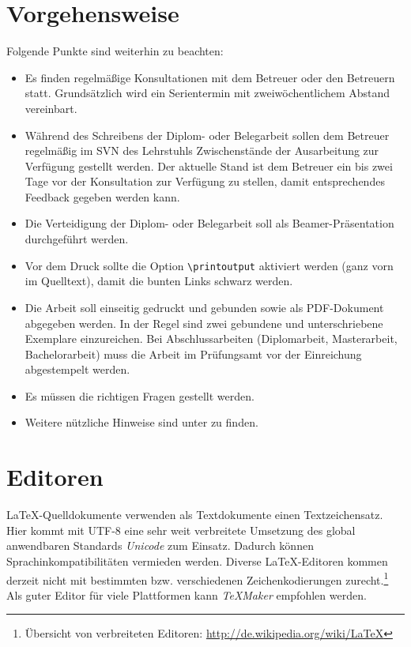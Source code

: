 \section{Vorgehensweise}
Folgende Punkte sind weiterhin zu beachten:
\begin{itemize}
	\item Es finden regelmäßige Konsultationen mit dem Betreuer oder den Betreuern statt. Grundsätzlich wird ein Serientermin mit zweiwöchentlichem Abstand vereinbart.
	\item Während des Schreibens der Diplom- oder Belegarbeit sollen dem Betreuer regelmäßig im \gls{SVN} des Lehrstuhls Zwischenstände der Ausarbeitung zur Verfügung gestellt werden. Der aktuelle Stand ist dem Betreuer ein bis zwei Tage vor der Konsultation zur Verfügung zu stellen, damit entsprechendes Feedback gegeben werden kann.
	\item Die Verteidigung der Diplom- oder Belegarbeit soll als Beamer-Präsentation durchgeführt werden.
	\item Vor dem Druck sollte die Option \texttt{\textbackslash{}printoutput} aktiviert werden (ganz vorn im Quelltext), damit die bunten Links schwarz werden.
	\item Die Arbeit soll einseitig gedruckt und gebunden sowie als PDF-Dokument abgegeben werden. In der Regel sind zwei gebundene und unterschriebene Exemplare einzureichen. Bei Abschlussarbeiten (Diplomarbeit, Masterarbeit, Bachelorarbeit) muss die Arbeit im Prüfungsamt vor der Einreichung abgestempelt werden.
	\item Es müssen die richtigen Fragen \cite{smartquestions} gestellt werden.
	\item Weitere nützliche Hinweise sind unter \cite{seusdiplomfaq} zu finden.
\end{itemize}

\section{Editoren}
\LaTeX{}-Quelldokumente verwenden als Textdokumente einen Textzeichensatz. Hier kommt mit UTF-8 eine sehr weit verbreitete Umsetzung des global anwendbaren Standards \emph{Unicode} zum Einsatz. Dadurch können Sprachinkompatibilitäten vermieden werden. Diverse \LaTeX{}-Editoren kommen derzeit nicht mit bestimmten bzw. verschiedenen Zeichenkodierungen zurecht.\footnote{Übersicht von verbreiteten Editoren: \url{http://de.wikipedia.org/wiki/LaTeX}} Als guter Editor für viele Plattformen kann \emph{TeXMaker} empfohlen werden.